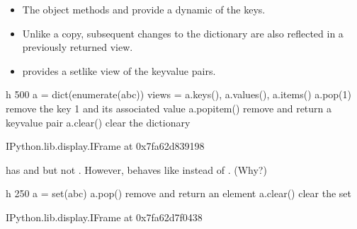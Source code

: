 \documentclass[letterpaper,10pt,english]{sphinxmanual}
\begin{document}
\noindent{}
\begin{itemize}
\item {} 
The object methods  and  provide a dynamic  of the keys.

\item {} 
Unlike a copy, subsequent changes to the dictionary are also reflected in a previously returned view.

\item {} 
 provides a set\sphinxhyphen{}like view of the key\sphinxhyphen{}value pairs.

\end{itemize}

\begin{sphinxVerbatim}[commandchars=\\\{\}]
 \PYGZhy{}h 500
a = dict(enumerate(\PYGZsq{}abc\PYGZsq{}))
views = a.keys(), a.values(), a.items()
a.pop(1)    \PYGZsh{} remove the key 1 and its associated value
a.popitem() \PYGZsh{} remove and return a key\PYGZhy{}value pair
a.clear()   \PYGZsh{} clear the dictionary
\end{sphinxVerbatim}

\begin{sphinxVerbatim}[commandchars=\\\{\}]
\PYGZlt{}IPython.lib.display.IFrame at 0x7fa62d839198\PYGZgt{}
\end{sphinxVerbatim}

 has  and  but not . However,  behaves like  instead of . (Why?)

\begin{sphinxVerbatim}[commandchars=\\\{\}]
 \PYGZhy{}h 250
a = set(\PYGZsq{}abc\PYGZsq{})
a.pop()     \PYGZsh{} remove and return an element
a.clear()   \PYGZsh{} clear the set
\end{sphinxVerbatim}

\begin{sphinxVerbatim}[commandchars=\\\{\}]
\PYGZlt{}IPython.lib.display.IFrame at 0x7fa62d7f0438\PYGZgt{}
\end{sphinxVerbatim}
\end{document}

